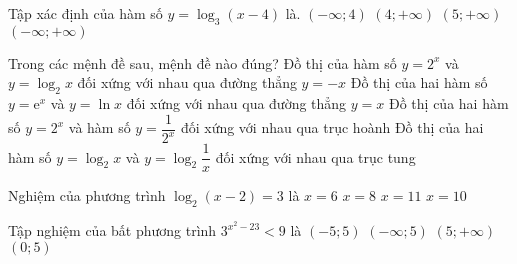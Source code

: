 \begin{ex}%
	Tập xác định của hàm số $y=\log_3\left(x-4\right)$ là.
	\choice
	{$\left(-\infty ;4\right)$}
	{\True $\left(4;+\infty\right)$}
	{$\left(5;+\infty\right)$}
	{$\left(-\infty ;+\infty\right)$}
\end{ex}

\begin{ex}%
	Trong các mệnh đề sau, mệnh đề nào đúng?
	\choice
	{Đồ thị của hàm số $y=2^x$ và $y=\log_2x$ đối xứng với nhau qua đường thẳng $y=-x$}
	{\True Đồ thị của hai hàm số $y=\mathrm{e}^x$ và $y=\ln x$ đối xứng với nhau qua đường thẳng $y=x$}
	{Đồ thị của hai hàm số $y=2^x$ và hàm số $y=\dfrac{1}{2^x}$ đối xứng với nhau qua trục hoành}
	{Đồ thị của hai hàm số $y=\log_2x$ và $y=\log_2\dfrac{1}{x}$ đối xứng với nhau qua trục tung}
\end{ex}
\begin{ex}%
	Nghiệm của phương trình $\log_2\left(x-2\right)=3$ là
	\choice
	{$x=6$}
	{$x=8$}
	{$x=11$}
	{\True $x=10$}
\end{ex}

\begin{ex}%
	Tập nghiệm của bất phương trình $3^{x^2-23}<9$ là
	\choice
	{\True $(-5 ; 5)$}
	{$(-\infty ; 5)$}
	{$(5 ;+\infty)$}
	{$(0 ; 5)$}
\end{ex}

